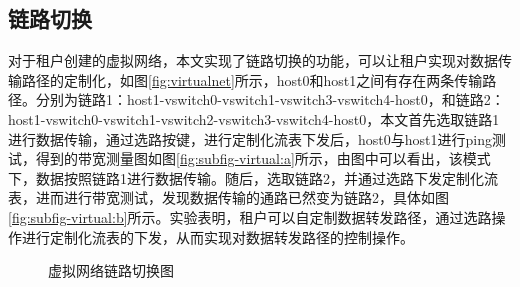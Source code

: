 \subsection{链路切换}
对于租户创建的虚拟网络，本文实现了链路切换的功能，可以让租户实现对数据传输路径的定制化，如图\ref{fig:virtualnet}所示，host0和host1之间有存在两条传输路径。分别为链路1：host1-vswitch0-vswitch1-vswitch3-vswitch4-host0，和链路2：host1-vswitch0-vswitch1-vswitch2-vswitch3-vswitch4-host0，本文首先选取链路1进行数据传输，通过选路按键，进行定制化流表下发后，host0与host1进行ping测试，得到的带宽测量图如图\ref{fig:subfig-virtual:a}所示，由图中可以看出，该模式下，数据按照链路1进行数据传输。随后，选取链路2，并通过选路下发定制化流表，进而进行带宽测试，发现数据传输的通路已然变为链路2，具体如图\ref{fig:subfig-virtual:b}所示。实验表明，租户可以自定制数据转发路径，通过选路操作进行定制化流表的下发，从而实现对数据转发路径的控制操作。

\begin{figure}
 \centering
 \caption{虚拟网络链路切换图}
 \label{fig:customlink} %
\end{figure}
